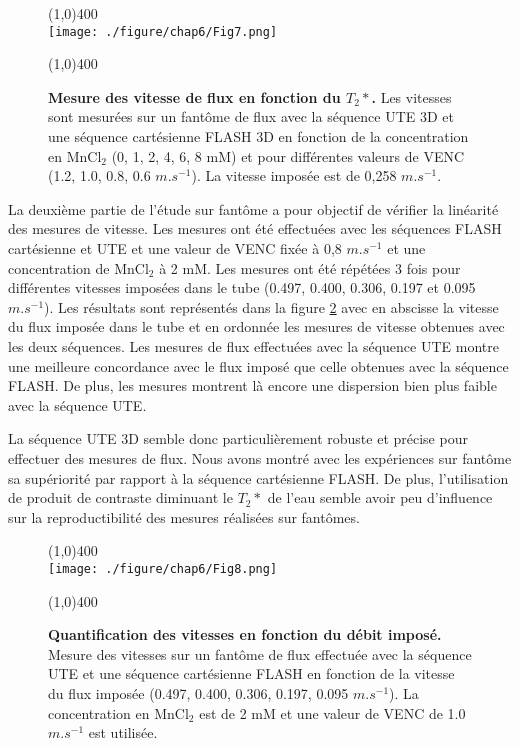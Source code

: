 \begin{figure}[h]
\centering
\line(1,0){400} \\
\texttt{[image: ./figure/chap6/Fig7.png]}
\caption[Mesure du flux en fonction du $T_2*$.]{\label{fig:FluxFantT2} \textbf{Mesure des vitesse de flux en fonction du $T_2*$.} Les vitesses sont mesurées sur un fantôme de flux avec la séquence UTE 3D et une séquence cartésienne FLASH 3D en fonction de la concentration en $\text{MnCl}_2$ (0, 1, 2, 4, 6, 8 mM) et pour différentes valeurs de VENC (1.2, 1.0, 0.8, 0.6 $m.s^{-1}$). La vitesse imposée est de 0,258 $m.s^{-1}$.}
\line(1,0){400} \\ 
\end{figure}

La deuxième partie de l'étude sur fantôme a pour objectif de vérifier la linéarité des mesures de vitesse. Les mesures ont été effectuées avec les séquences FLASH cartésienne et UTE et une valeur de VENC fixée à 0,8 $m.s^{-1}$ et une concentration de $\text{MnCl}_2$ à 2 mM. Les mesures ont été répétées 3 fois pour différentes vitesses imposées dans le tube (0.497, 0.400, 0.306, 0.197 et 0.095 $m.s^{-1}$). 
Les résultats sont représentés dans la figure \ref{fig:FluxFantLinear} avec en abscisse la vitesse du flux imposée dans le tube et en ordonnée les mesures de vitesse obtenues avec les deux séquences. Les mesures de flux effectuées avec la séquence UTE montre une meilleure concordance avec le flux imposé que celle obtenues avec la séquence FLASH. De plus, les mesures montrent là encore une dispersion bien plus faible avec la séquence UTE.

La séquence UTE 3D semble donc particulièrement robuste et précise pour effectuer des mesures de flux.  Nous avons montré avec les expériences sur fantôme sa supériorité par rapport à la séquence cartésienne FLASH. De plus, l’utilisation de produit de contraste diminuant le $T_2*$ de l’eau semble avoir peu d’influence sur la reproductibilité des mesures réalisées sur fantômes.

\begin{figure}[H]
\centering
\line(1,0){400} \\
\texttt{[image: ./figure/chap6/Fig8.png]}
\caption[Quantification des vitesses en fonction du débit imposé.]{\label{fig:FluxFantLinear} \textbf{Quantification des vitesses en fonction du débit imposé.} Mesure des vitesses sur un fantôme de flux effectuée avec la séquence UTE et une séquence cartésienne FLASH en fonction de la vitesse du flux imposée (0.497, 0.400, 0.306, 0.197, 0.095 $m.s^{-1}$). La concentration en $\text{MnCl}_2$ est de 2 mM et une valeur de VENC de 1.0 $m.s^{-1}$ est utilisée.}
\line(1,0){400} \\ 
\end{figure}


